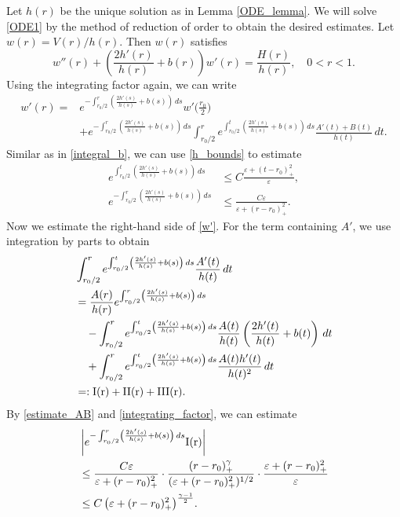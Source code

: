 \documentclass[reqno, 10pt]{amsart}
\theoremstyle{plain}
\theoremstyle{definition}
\theoremstyle{remark}
\numberwithin{equation}{section}
\begin{document}
Let $h(r)$ be the unique solution as in Lemma \ref{ODE_lemma}. 
We will solve \eqref{ODE1} by the method of reduction of order to obtain the desired estimates. Let $w(r) = V(r)/h(r)$. Then $w(r)$ satisfies
$$
w''(r) + \left( \frac{2h'(r)}{h(r)} + b(r) \right) w'(r) = \frac{H(r)}{h(r)}, \quad 0 < r < 1.
$$
Using the integrating factor again, we can write
\begin{equation}\label{w'}
\begin{aligned}
w'(r) =& e^{-\int_{r_0/2}^r \left(\frac{2h'(s)}{h(s)} + b(s)\right) \, ds}w'\Big(\frac{r_0}{2}\Big)\\
&+  e^{-\int_{r_0/2}^r \left(\frac{2h'(s)}{h(s)} + b(s)\right) \, ds} \int_{r_0/2}^r  e^{\int_{r_0/2}^t \left(\frac{2h'(s)}{h(s)} + b(s)\right) \, ds} \frac{A'(t) + B(t)}{h(t)} \, dt.
\end{aligned}
\end{equation}
Similar as in \eqref{integral_b}, we can use \eqref{h_bounds} to estimate
\begin{equation}\label{integrating_factor}
\begin{aligned}
e^{\int_{r_0/2}^t \left(\frac{2h'(s)}{h(s)} + b(s)\right) \, ds} &\le C \frac{\varepsilon + (t - r_0)_+^2}{\varepsilon}, \\ 
e^{-\int_{r_0/2}^r \left(\frac{2h'(s)}{h(s)} + b(s)\right) \, ds} &\le  \frac{C\varepsilon}{\varepsilon + (r - r_0)_+^2}.    
\end{aligned}
\end{equation}
Now we estimate the right-hand side of \eqref{w'}. For the term containing $A'$, we use integration by parts to obtain
\begin{align*}
&\int_{r_0/2}^r  e^{\int_{r_0/2}^t \left(\frac{2h'(s)}{h(s)} + b(s)\right) \, ds} \frac{A'(t)}{h(t)} \, dt\\
&= \frac{A(r)}{h(r)}e^{\int_{r_0/2}^r \left(\frac{2h'(s)}{h(s)} + b(s)\right) \, ds}\\
&\quad - \int_{r_0/2}^r  e^{\int_{r_0/2}^t \left(\frac{2h'(s)}{h(s)} + b(s)\right) \, ds} \frac{A(t)}{h(t)} \left( \frac{2h'(t)}{h(t)} + b(t) \right) \, dt\\
&\quad + \int_{r_0/2}^r  e^{\int_{r_0/2}^t \left(\frac{2h'(s)}{h(s)} + b(s)\right) \, ds} \frac{A(t)h'(t)}{h(t)^2}\, dt\\
&=: \rm{I}(r) + \rm{II}(r) + \rm{\rm{III}}(r).
\end{align*}
By \eqref{estimate_AB} and \eqref{integrating_factor}, we can estimate
\begin{equation}\label{est:A-1}
\begin{aligned}
    &\left| e^{-\int_{r_0/2}^r \left(\frac{2h'(s)}{h(s)} + b(s)\right) \, ds} \rm{I}(r) \right|\\
    &\le \frac{C\varepsilon}{\varepsilon + (r - r_0)_+^2} \cdot \frac{(r-r_0)_+^\gamma}{(\varepsilon + (r-r_0)_+^2)^{1/2}} \cdot \frac{\varepsilon + (r - r_0)_+^2}{\varepsilon}\\
    &\le  C\,\big(\varepsilon + (r-r_0)_+^2\big)^{\frac{\gamma-1}{2}}.
\end{aligned}
\end{equation}
\end{document}
